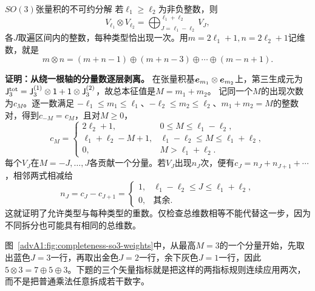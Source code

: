 \begin{advtheorem}{$SO(3)$张量积的不可约分解}\label{advA1:thm:so3-decomposition}
若$\ell_1\ge\ell_2$为非负整数，则
\[
 V_{\ell_1}\otimes V_{\ell_2}
 =\bigoplus_{J=\ell_1-\ell_2}^{\ell_1+\ell_2}V_J,
\]
各$J$取遍区间内的整数，每种类型恰出现一次。用$m=2\ell_1+1,n=2\ell_2+1$记维数，就是
\[
 m\otimes n=(m+n-1)\oplus(m+n-3)\oplus\cdots\oplus(m-n+1).
\]
\end{advtheorem}
\textbf{证明：从绕一根轴的分量数逐层剥离。}
在张量积基$\bm{e}_{m_1}\otimes\bm{e}_{m_2}$上，第三生成元为
$\mathsf J_3^{\rm tot}=\mathsf J_3^{(1)}\otimes\mathsf1+\mathsf1\otimes\mathsf J_3^{(2)}$，故总本征值是$M=m_1+m_2$。
记同一个$M$的出现次数为$c_M$。逐一数满足
$-\ell_1\le m_1\le\ell_1$、$-\ell_2\le m_2\le\ell_2$、$m_1+m_2=M$的整数对，得到$c_{-M}=c_M$，且对$M\ge0$，
\[
 c_M=\begin{cases}
  2\ell_2+1,&0\le M\le\ell_1-\ell_2,\\
  \ell_1+\ell_2-M+1,&\ell_1-\ell_2\le M\le\ell_1+\ell_2,\\
  0,&M>\ell_1+\ell_2.
 \end{cases}
\]
每个$V_J$在$M=-J,\ldots,J$各贡献一个分量。若$V_J$出现$n_J$次，便有$c_J=n_J+n_{J+1}+\cdots$，相邻两式相减给
\[
 n_J=c_J-c_{J+1}
 =\begin{cases}1,&\ell_1-\ell_2\le J\le\ell_1+\ell_2,\\0,&\text{其余}.
 \end{cases}
\]
这就证明了允许类型与每种类型的重数。仅检查总维数相等不能代替这一步，因为不同拆分也可能具有相同的总维数。

\begin{qualityfigure}
\label{advA1:fig:completeness-so3-weights}
\end{qualityfigure}
图~\ref{advA1:fig:completeness-so3-weights}中，从最高$M=3$的一个分量开始，先取出蓝色$J=3$一行，再取出金色$J=2$一行，余下灰色$J=1$一行，因此$5\otimes3=7\oplus5\oplus3$。下题的三个矢量指标就是把这样的两指标规则连续应用两次，而不是把普通乘法任意拆成若干数字。

